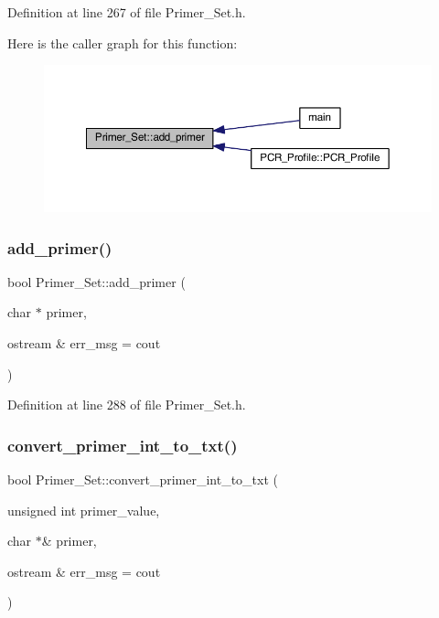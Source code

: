 Definition at line 267 of file Primer\+\_\+\+Set.\+h.

Here is the caller graph for this function\+:
\nopagebreak
\begin{figure}[H]
\begin{center}
\leavevmode
\includegraphics[width=350pt]{class_primer___set_a136e11664762cb801c833209a68204fe_icgraph}
\end{center}
\end{figure}
\mbox{\label{class_primer___set_acbbf2f8583751542a18f895e44643be2}} 
\subsubsection{\texorpdfstring{add\+\_\+primer()}{add\_primer()}\hspace{0.1cm}{\footnotesize\ttfamily [2/2]}}
{\footnotesize\ttfamily bool Primer\+\_\+\+Set\+::add\+\_\+primer (\begin{DoxyParamCaption}\item[{char $\ast$}]{primer,  }\item[{ostream \&}]{err\+\_\+msg = {\ttfamily cout} }\end{DoxyParamCaption})}



Definition at line 288 of file Primer\+\_\+\+Set.\+h.

\mbox{\label{class_primer___set_af45de3f0a9a7cac592aa66e15f1d6155}} 
\subsubsection{\texorpdfstring{convert\+\_\+primer\+\_\+int\+\_\+to\+\_\+txt()}{convert\_primer\_int\_to\_txt()}}
{\footnotesize\ttfamily bool Primer\+\_\+\+Set\+::convert\+\_\+primer\+\_\+int\+\_\+to\+\_\+txt (\begin{DoxyParamCaption}\item[{unsigned int}]{primer\+\_\+value,  }\item[{char $\ast$\&}]{primer,  }\item[{ostream \&}]{err\+\_\+msg = {\ttfamily cout} }\end{DoxyParamCaption})}



